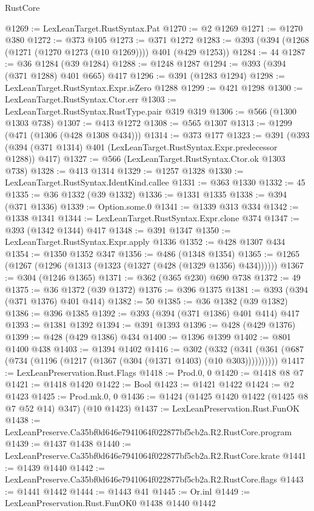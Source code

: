\begin{lexlean}{RustCore}
\begin{coremodule}
@1269 := LexLeanTarget.RustSyntax.Pat
@1270 := @2 @1269
@1271 := @1270 @380
@1272 := @373 @105
@1273 := @371 @1272
@1283 := @393 (@394 (@1268 (@1271 (@1270 @1273 (@10 @1269)))) @401 (@429 @1253))
@1284 := 44
@1287 := @36 @1284 (@39 @1284)
@1288 := @1248 @1287
@1294 := @393 (@394 (@371 @1288) @401 @665) @417
@1296 := @391 (@1283 @1294)
@1298 := LexLeanTarget.RustSyntax.Expr.isZero @1288
@1299 := @421 @1298
@1300 := LexLeanTarget.RustSyntax.Ctor.err
@1303 := LexLeanTarget.RustSyntax.RustType.pair @319 @319
@1306 := @566 (@1300 @1303 @738)
@1307 := @413 @1272
@1308 := @565 @1307
@1313 := @1299 (@471 (@1306 (@428 @1308 @434)))
@1314 := @373 @177
@1323 := @391 (@393 (@394 (@371 @1314) @401 (LexLeanTarget.RustSyntax.Expr.predecessor @1288)) @417)
@1327 := @566 (LexLeanTarget.RustSyntax.Ctor.ok @1303 @738)
@1328 := @413 @1314
@1329 := @1257 @1328
@1330 := LexLeanTarget.RustSyntax.IdentKind.callee
@1331 := @363 @1330
@1332 := 45
@1335 := @36 @1332 (@39 @1332)
@1336 := @1331 @1335
@1338 := @394 (@371 @1336)
@1339 := Option.some.{0}
@1341 := @1339 @313 @334
@1342 := @1338 @1341
@1344 := LexLeanTarget.RustSyntax.Expr.clone @374
@1347 := @393 (@1342 @1344) @417
@1348 := @391 @1347
@1350 := LexLeanTarget.RustSyntax.Expr.apply @1336
@1352 := @428 @1307 @434
@1354 := @1350 @1352 @347
@1356 := @486 (@1348 @1354)
@1365 := @1265 (@1267 (@1296 (@1313 (@1323 (@1327 (@428 (@1329 @1356) @434))))))
@1367 := @304 (@1246 @1365)
@1371 := @362 (@365 @230) @690 @738
@1372 := 49
@1375 := @36 @1372 (@39 @1372)
@1376 := @396 @1375
@1381 := @393 (@394 (@371 @1376) @401 @414)
@1382 := 50
@1385 := @36 @1382 (@39 @1382)
@1386 := @396 @1385
@1392 := @393 (@394 (@371 @1386) @401 @414) @417
@1393 := @1381 @1392
@1394 := @391 @1393
@1396 := @428 (@429 @1376)
@1399 := @428 (@429 @1386) @434
@1400 := @1396 @1399
@1402 := @801 @1400 @438
@1403 := @1394 @1402
@1416 := @302
    (@332 (@341 (@361 (@687 (@734 (@1196 (@1217 (@1367 (@304 (@1371 @1403) (@10 @303))))))))))
@1417 := LexLeanPreservation.Rust.Flags
@1418 := Prod.{0, 0}
@1420 := @1418 @8 @7
@1421 := @1418 @1420
@1422 := Bool
@1423 := @1421 @1422
@1424 := @2 @1423
@1425 := Prod.mk.{0, 0}
@1436 := @1424 (@1425 @1420 @1422 (@1425 @8 @7 @52 @14) @347) (@10 @1423)
@1437 := LexLeanPreservation.Rust.FunOK
@1438 := LexLeanPreserve.Ca35bf0d646e7941064f022877bf5cb2a.R2.RustCore.program
@1439 := @1437 @1438
@1440 := LexLeanPreserve.Ca35bf0d646e7941064f022877bf5cb2a.R2.RustCore.krate
@1441 := @1439 @1440
@1442 := LexLeanPreserve.Ca35bf0d646e7941064f022877bf5cb2a.R2.RustCore.flags
@1443 := @1441 @1442
@1444 := @1443 @41
@1445 := Or.inl
@1449 := LexLeanPreservation.Rust.FunOK0 @1438 @1440 @1442

\end{coremodule}
\end{lexlean}
